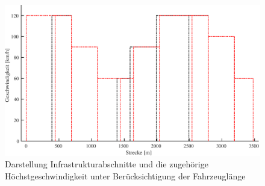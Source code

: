 \begin{figure}
\includegraphics[width=\linewidth]{../images/matlab/it2.pdf}
\caption{Darstellung Infrastrukturabschnitte und die zugehörige Höchstgeschwindigkeit unter Berücksichtigung der Fahrzeuglänge}
\label{fig:it2}
\end{figure}
